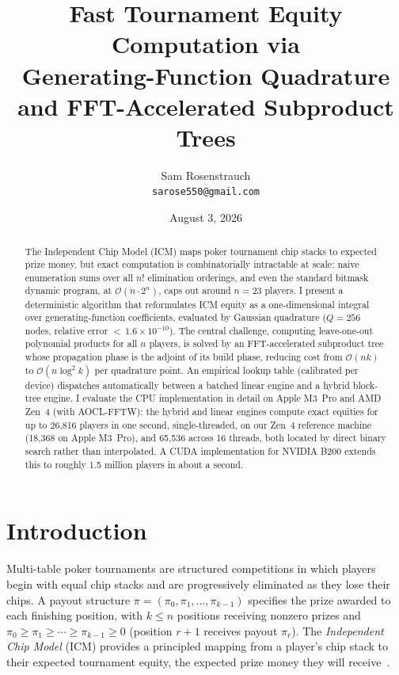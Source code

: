 \documentclass[11pt]{article}
\title{Fast Tournament Equity Computation via \\
       Generating-Function Quadrature and FFT-Accelerated Subproduct Trees}
\author{Sam Rosenstrauch \\
        \texttt{sarose550@gmail.com}}
\date{August 3, 2026}
\newcommand{\bigO}{\mathcal{O}}
\begin{document}
\maketitle

\begin{abstract}
The Independent Chip Model (ICM) maps poker tournament chip stacks to
expected prize money, but exact computation is combinatorially
intractable at scale: naive enumeration sums over all $n!$ elimination
orderings, and even the standard bitmask dynamic program, at
$\bigO(n \cdot 2^n)$, caps out around $n = 23$ players. I present a
deterministic algorithm that
reformulates ICM equity as a one-dimensional integral over
generating-function coefficients, evaluated by Gaussian quadrature
($Q = 256$ nodes, relative error ${<}\,1.6 \times 10^{-10}$). The
central challenge, computing leave-one-out polynomial products for all
$n$ players, is solved by an FFT-accelerated subproduct tree whose
propagation phase is the adjoint of its build phase, reducing cost from
$\bigO(nk)$ to $\bigO(n \log^2 k)$ per quadrature point. An empirical
lookup table (calibrated per device) dispatches
automatically between a batched linear engine and a hybrid block-tree
engine. I evaluate the CPU implementation in detail on Apple M3~Pro and
AMD Zen~4 (with AOCL-FFTW): the hybrid and linear engines compute exact
equities for up to 26,816 players in one second, single-threaded, on our
Zen~4 reference machine (18,368 on Apple M3~Pro), and 65,536 across 16
threads, both located by direct binary search rather than interpolated.
A CUDA implementation for NVIDIA B200 extends this to roughly
1.5 million players in about a second.
\end{abstract}

\section{Introduction}\label{sec:intro}

Multi-table poker tournaments are structured competitions in which
players begin with equal chip stacks and are progressively eliminated as
they lose their chips. A payout structure $\pi = (\pi_0, \pi_1, \ldots, \pi_{k-1})$ specifies the prize awarded to each finishing position, with
$k \leq n$ positions receiving nonzero prizes and $\pi_0 \geq \pi_1 \geq
\cdots \geq \pi_{k-1} \geq 0$ (position $r+1$ receives payout $\pi_r$). The \emph{Independent Chip Model} (ICM)
provides a principled mapping from a player's chip stack to their
expected tournament equity, the expected prize money they will
receive~\citep{malmuth1987,harville1973}.
\end{document}
